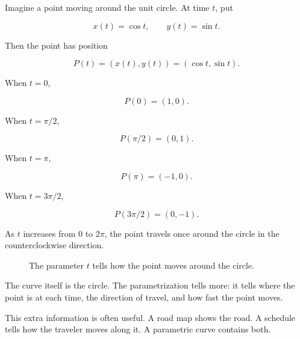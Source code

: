 Imagine a point moving around the unit circle.  At time \(t\), put

\[
x(t)=\cos t,
\qquad
y(t)=\sin t.
\]

Then the point has position

\[
P(t)=(x(t),y(t))=(\cos t,\sin t).
\]

When \(t=0\),

\[
P(0)=(1,0).
\]

When \(t=\pi/2\),

\[
P(\pi/2)=(0,1).
\]

When \(t=\pi\),

\[
P(\pi)=(-1,0).
\]

When \(t=3\pi/2\),

\[
P(3\pi/2)=(0,-1).
\]

As \(t\) increases from \(0\) to \(2\pi\), the point travels once around the circle in the
counterclockwise direction.

\begin{figure}[h]
\centering
{}
\caption{The parameter \(t\) tells how the point moves around the circle.}
\label{fig:parametric-unit-circle}
\end{figure}

The curve itself is the circle.  The parametrization tells more: it tells where the point is
at each time, the direction of travel, and how fast the point moves.

This extra information is often useful.  A road map shows the road.  A schedule tells
how the traveler moves along it.  A parametric curve contains both.

